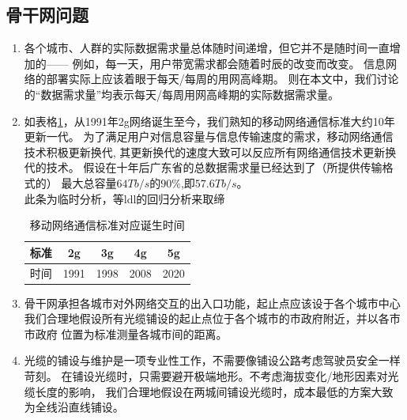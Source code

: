 \documentclass[UTF8,12pt]{ctexart}
\begin{document}
    \subsection{骨干网问题}
        \begin{enumerate}
        \item 各个城市、人群的实际数据需求量总体随时间递增，但它并不是随时间一直增加的——
            例如，每一天，用户带宽需求都会随着时辰的改变而改变。
            信息网络的部署实际上应该着眼于每天/每周的用网高峰期。
            则在本文中，我们讨论的“数据需求量”均表示每天/每周用网高峰期的实际数据需求量。
        \item 如表格\ref{2g}，从1991年2g网络诞生至今，我们熟知的移动网络通信标准大约10年更新一代。
        为了满足用户对信息容量与信息传输速度的需求，移动网络通信技术积极更新换代,
        其更新换代的速度大致可以反应所有网络通信技术更新换代的技术。
        假设在十年后广东省的总数据需求量已经达到了（所提供传输格式的）
        最大总容量$64Tb/s$的$90\%$,即$57.6Tb/s$。\\
        \Huge{此条为临时分析，等ldl的回归分析来取缔}\normalsize
        \begin{table}[htbp]
            \centering
              \begin{tabular}{ccccc}
              \toprule
              标准     & 2g     & 3g     & 4g     & 5g \\
              \midrule
              时间     & 1991   & 1998   & 2008   & 2020 \\
              \bottomrule
              \end{tabular}%
            \caption{移动网络通信标准对应诞生时间}\label{2g}
          \end{table}%

        \item 骨干网承担各城市对外网络交互的出入口功能，起止点应该设于各个城市中心
            我们合理地假设所有光缆铺设的起止点位于各个城市的市政府附近，并以各市市政府
            位置为标准测量各城市间的距离。
            
        \item 光缆的铺设与维护是一项专业性工作，不需要像铺设公路考虑驾驶员安全一样苛刻。
            在铺设光缆时，只需要避开极端地形。不考虑海拔变化/地形因素对光缆长度的影响，
            我们合理地假设在两城间铺设光缆时，成本最低的方案大致为全线沿直线铺设。
        \end{enumerate}
\end{document}
